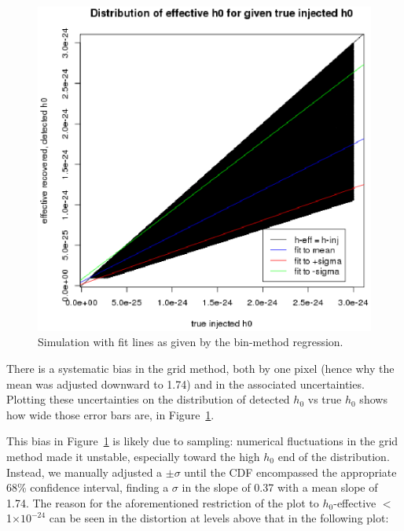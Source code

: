 \begin{figure}
\begin{center}
\includegraphics[trim=0 10 10 5, clip, width=0.72\paperwidth,height=0.48\paperheight]{PlotHEffVsH0TrueWithLines.eps}
\caption{Simulation with fit lines as given by the bin-method regression.
\label{fig:plotheffvsh0truewithlines}}
\end{center}
\end{figure}

There is a systematic bias in the grid method, both by one pixel (hence why the mean was adjusted downward to 1.74) and in the associated uncertainties. Plotting these uncertainties on the distribution of {detected $h_0$} vs {true $h_0$} shows how wide those error bars are, in Figure~\ref{fig:plotheffvsh0truewithlines}.


This bias in Figure~\ref{fig:plotheffvsh0truewithlines} is likely due to sampling: numerical fluctuations in the grid method made it unstable,
especially toward the high $h_0$ end of the distribution. Instead, we manually adjusted a $\pm \sigma$ until the CDF encompassed the appropriate 68\% confidence interval, finding a $\sigma$ in the slope of 0.37 with a mean slope of 1.74. The reason for the aforementioned restriction of the plot to $h_0$-effective $<$ 1$\times 10^{-24}$ can be seen in the distortion at levels above that in the following plot:

